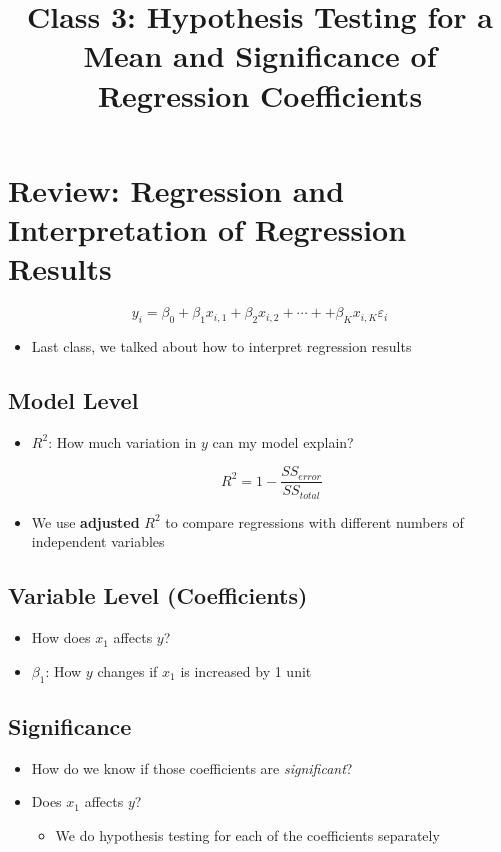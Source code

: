 \documentclass[10pt,article]{article}
\date{\vspace{-6ex}}
\title{Class 3: Hypothesis Testing for a Mean and Significance of Regression Coefficients}
\begin{document}
\maketitle
{} 
\thispagestyle{fancy}

\setcounter{tocdepth}{1}
\tableofcontents
\vspace{6ex}

\section{Review: Regression and Interpretation of Regression Results}
\label{sec:org0923b0d}
\[  y_{i} = \beta_0 + \beta_1 x_{i, 1}  + \beta_2 x_{i, 2} + \cdots +  + \beta_K x_{i, K}  \varepsilon_{i} \]

\begin{itemize}
\item Last class, we talked about how to interpret regression results
\end{itemize}

\subsection{Model Level}
\label{sec:org33e8819}
\begin{itemize}
\item \(R^2\): How much variation in \(y\) can my model explain?

\[ R^{2} = 1 - \dfrac{SS_{error}}{SS_{total}} \]
\item We use \textbf{adjusted} \(R^2\) to compare regressions with
different numbers of independent variables
\end{itemize}

\subsection{Variable Level (Coefficients)}
\label{sec:orgee45dcd}
\begin{itemize}
\item How does \(x_1\) affects \(y\)?
\item \(\beta_1\): How \(y\) changes if \(x_1\) is increased by 1 unit
\end{itemize}
\subsection{Significance}
\label{sec:org5991109}
\begin{itemize}
\item How do we know if those coefficients are \emph{significant}?
\item Does \(x_1\) affects \(y\)?

\begin{itemize}
\item We do hypothesis testing for each of the coefficients separately
\end{itemize}
\end{itemize}
\end{document}
